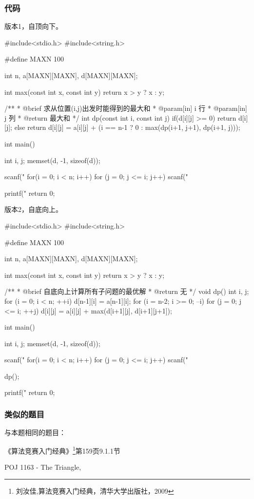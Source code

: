 \subsubsection{代码}
版本1，自顶向下。

\begin{Codex}[label=numbers_triangle1.c]
#include<stdio.h>
#include<string.h>

#define MAXN 100

int n, a[MAXN][MAXN], d[MAXN][MAXN];

int max(const int x, const int y) {
    return x > y ? x : y;
}

/**
 * @brief 求从位置(i,j)出发时能得到的最大和
 * @param[in] i 行
 * @param[in] j 列
 * @return 最大和
 */
int dp(const int i, const int j) {
    if(d[i][j] >= 0) {
        return d[i][j];
    } else {
        return d[i][j] = a[i][j] + (i == n-1 ? 0 : max(dp(i+1, j+1), dp(i+1, j)));
    }
}

int main() {
    int i, j;
    memset(d, -1, sizeof(d));

    scanf("%
    for(i = 0; i < n; i++)
      for (j = 0; j <= i; j++) scanf("%
    
    printf("%
    return 0;
}
\end{Codex}

版本2，自底向上。

\begin{Codex}[label=numbers_triangle2.c]
#include<stdio.h>
#include<string.h>

#define MAXN 100

int n, a[MAXN][MAXN], d[MAXN][MAXN];

int max(const int x, const int y) {
    return x > y ? x : y;
}

/**
 * @brief 自底向上计算所有子问题的最优解
 * @return 无
 */
void dp() {
    int i, j;
    for (i = 0; i < n; ++i) {
        d[n-1][i] = a[n-1][i];
    }
    for (i = n-2; i >= 0; --i)
      for (j = 0; j <= i; ++j)
        d[i][j] = a[i][j] + max(d[i+1][j], d[i+1][j+1]);
}

int main() {
    int i, j;
    memset(d, -1, sizeof(d));

    scanf("%
    for(i = 0; i < n; i++)
      for (j = 0; j <= i; j++) 
          scanf("%

    dp();
    
    printf("%
    return 0;
}
\end{Codex}

\subsubsection{类似的题目}
与本题相同的题目：
\begindot
\item 《算法竞赛入门经典》\footnote{刘汝佳,算法竞赛入门经典，清华大学出版社，2009}第159页9.1.1节
\item  POJ 1163 - The Triangle, 
\myenddot

